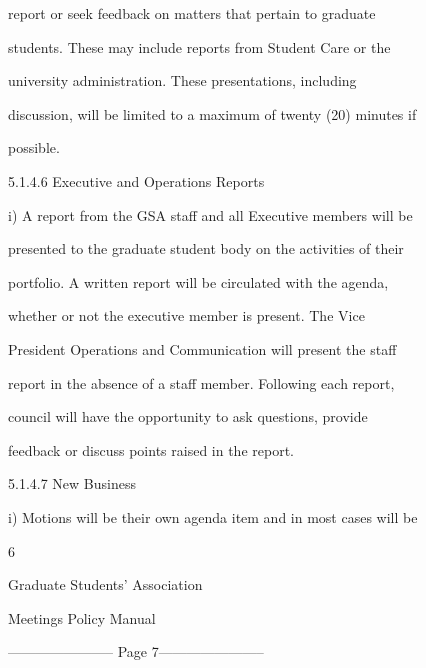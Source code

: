              report   or   seek   feedback   on   matters   that   pertain   to   graduate  

              students.  These  may  include  reports  from  Student  Care  or  the  

              university          administration.            These         presentations,            including  

              discussion, will be limited to a maximum of twenty (20) minutes if  

              possible.  

  

5.1.4.6   Executive and Operations Reports  

  

     i)       A  report  from  the  GSA  staff  and  all  Executive  members  will  be  

              presented  to  the  graduate  student  body  on  the  activities  of  their  

              portfolio.  A  written  report  will  be  circulated  with  the  agenda,  

              whether   or   not   the   executive   member   is   present.   The   Vice  

              President  Operations  and  Communication  will  present  the  staff  

              report  in  the  absence  of  a  staff  member.  Following  each  report,  

              council   will   have   the   opportunity   to   ask   questions,   provide  

              feedback or discuss points raised in the report.   

  

5.1.4.7  New Business   

  

  

     i)       Motions will be their own agenda item and in most cases will be  

                                                            6  

                                         

                                     Graduate Students’ Association  

                                          Meetings Policy Manual  

  


----------------------- Page 7-----------------------

